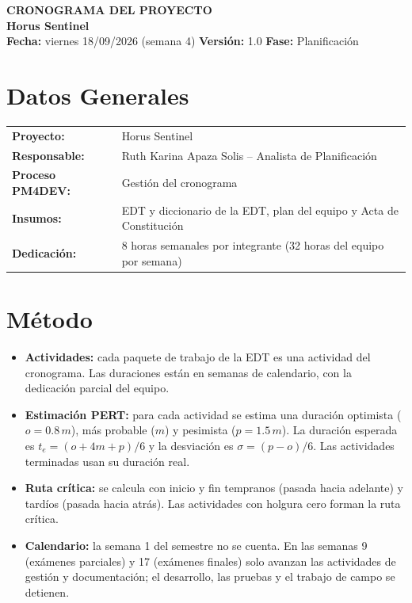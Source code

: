 \documentclass[11pt,a4paper]{article}
\begin{document}
\begin{center}
    {\Large \textbf{\textcolor{AzulUNA}{CRONOGRAMA DEL PROYECTO}}}\\[3pt]
    {\normalsize \textbf{Horus Sentinel}}\\[4pt]
    \footnotesize \textbf{Fecha:} viernes 18/09/2026 (semana 4) \quad \textbar\quad \textbf{Versión:} 1.0 \quad \textbar\quad \textbf{Fase:} Planificación
\end{center}

\vspace{0.1cm}

\section{Datos Generales}
\noindent\begin{tabularx}{\textwidth}{@{}P{4.2cm} L@{}}
\toprule
\textbf{Proyecto:} & Horus Sentinel \\
\textbf{Responsable:} & Ruth Karina Apaza Solis -- Analista de Planificación \\
\textbf{Proceso PM4DEV:} & Gestión del cronograma \\
\textbf{Insumos:} & EDT y diccionario de la EDT, plan del equipo y Acta de Constitución \\
\textbf{Dedicación:} & 8 horas semanales por integrante (32 horas del equipo por semana) \\
\bottomrule
\end{tabularx}

\section{Método}
\begin{itemize}[leftmargin=*]
    \item \textbf{Actividades:} cada paquete de trabajo de la EDT es una actividad del cronograma. Las duraciones están en semanas de calendario, con la dedicación parcial del equipo.
    \item \textbf{Estimación PERT:} para cada actividad se estima una duración optimista ($o = 0.8\,m$), más probable ($m$) y pesimista ($p = 1.5\,m$). La duración esperada es $t_e = (o + 4m + p)/6$ y la desviación es $\sigma = (p - o)/6$. Las actividades terminadas usan su duración real.
    \item \textbf{Ruta crítica:} se calcula con inicio y fin tempranos (pasada hacia adelante) y tardíos (pasada hacia atrás). Las actividades con holgura cero forman la ruta crítica.
    \item \textbf{Calendario:} la semana 1 del semestre no se cuenta. En las semanas 9 (exámenes parciales) y 17 (exámenes finales) solo avanzan las actividades de gestión y documentación; el desarrollo, las pruebas y el trabajo de campo se detienen.
\end{itemize}
\end{document}
